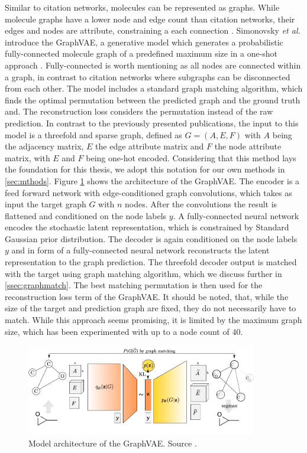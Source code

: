Similar to citation networks, molecules can be represented as graphs. While molecule graphs have a lower node and edge count than citation networks, their edges and nodes are attribute, constraining a each connection .
Simonovsky \textit{et al.} introduce the GraphVAE, a generative model which generates a probabilistic fully-connected molecule graph of a predefined maximum size
in a one-shot approach \cite{simonovsky_graphvae_2018}. Fully-connected is worth mentioning as all nodes are connected within a graph, in contrast to citation networks where subgraphs can be disconnected from each other. The model includes a standard graph matching algorithm, which finds the optimal permutation between the predicted graph and the ground truth and. The reconstruction loss considers the permutation instead of the raw prediction. In contrast to the previously presented publications, the input to this model is a threefold and sparse graph, defined as $G=(A, E, F)$ with $A$ being the adjacency matrix, $E$ the edge attribute matrix and $F$ the node attribute matrix, with $E$ and $F$ being one-hot encoded. Considering that this method lays the foundation for this thesis, we adopt this notation for our own methods in \ref{sec:mthods}. Figure \ref{fig:graphvaefull} shows the architecture of the GraphVAE. The encoder is a feed forward network with edge-conditioned graph convolutions, which takes as input the target graph $G$ with $n$ nodes. After the convolutions the result is flattened and conditioned on the node labels $y$. A fully-connected neural network encodes the stochastic latent representation, which is constrained by Standard Gaussian prior distribution. The decoder is again conditioned on the node labels $y$ and in form of a fully-connected neural network reconstructs the latent representation to the graph prediction. The threefold decoder output is matched with the target using graph matching algorithm, which we discuss further in \ref{ssec:graphmatch}. The best matching permutation is then used for the reconstruction loss term of the GraphVAE. It should be noted, that, while the size of the target and prediction graph are fixed, they do not necessarily have to match. While this approach seems promising, it is limited by the maximum graph size, which has been experimented with up to a node count of $40$.


\begin{figure}[h]
    \centering
    \includegraphics[width=0.9\textwidth]{data/images/GraphVAEfull.png}
    \caption{Model architecture of the GraphVAE. Source \cite{simonovsky_graphvae_2018}.}
    \label{fig:graphvaefull}
\end{figure}

